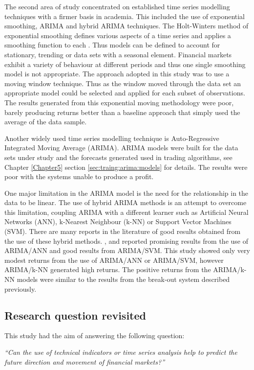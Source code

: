 The second area of study concentrated on established time series modelling techniques with a firmer basis in academia. This included the use of exponential smoothing, ARIMA and hybrid ARIMA techniques. The Holt-Winters method of exponential smoothing defines various aspects of a time series and applies a smoothing function to each \citep{Winters1960}. Thus models can be defined to account for stationary, trending or data sets with a seasonal element. Financial markets exhibit a variety of behaviour at different periods and thus one single smoothing model is not appropriate. The approach adopted in this study was to use a moving window technique. Thus as the window moved through the data set an appropriate model could be selected and applied for each subset of observations. The results generated from this exponential moving methodology were poor, barely producing returns better than a baseline approach that simply used the average of the data sample.

Another widely used time series modelling technique is Auto-Regressive Integrated Moving Average (ARIMA). ARIMA models were built for the data sets under study and the forecasts generated used in trading algorithms, see Chapter \ref{Chapter5} section \ref{sec:traing:arima:models} for details. The results were poor with the systems unable to produce a profit. 

One major limitation in the ARIMA model is the need for the relationship in the data to be linear. The use of hybrid ARIMA methods is an attempt to overcome this limitation, coupling ARIMA with a different learner such as Artificial Neural Networks (ANN), k-Nearest Neighbour (k-NN) or Support Vector Machines (SVM). There are many reports in the literature of good results obtained from the use of these hybrid methods. \cite{Wang2012758}, \cite{Khashei2009956} and \cite{Zhang2003159} reported promising results from the use of ARIMA/ANN and \cite{Pai2005497} good results from ARIMA/SVM. This study showed only very modest returns from the use of ARIMA/ANN or ARIMA/SVM, however ARIMA/k-NN generated high returns. The positive returns from the ARIMA/k-NN models were similar to the results from the break-out system described previously.

\subsection{Research question revisited}
This study had the aim of answering the following question:

\textit{\textquotedblleft Can the use of technical indicators or time series analysis help to predict the future direction and movement of financial markets?\textquotedblright}

